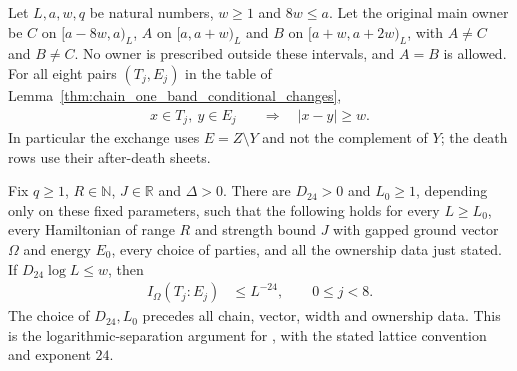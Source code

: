 \begin{lemma}
    \label{thm:chain_band_physical_information}
    \leanok
    Let $L,a,w,q$ be natural numbers, $w\ge1$ and $8w\le a$.
    Let the original main owner be $C$ on
    $\lbrack a-8w,a)_L$, $A$ on $\lbrack a,a+w)_L$ and $B$ on
    $[a+w,a+2w)_L$, with $A\ne C$ and $B\ne C$.
    No owner is prescribed outside these intervals, and $A=B$ is allowed.
    For all eight pairs $(T_j,E_j)$ in the table of
    Lemma~\ref{thm:chain_one_band_conditional_changes},
    \begin{align}
        x\in T_j,\ y\in E_j & \quad\Longrightarrow\quad |x-y|\ge w.
        \label{eq:chain_band_separation}
    \end{align}
    In particular the exchange uses $E=Z\setminus Y$ and not the
    complement of $Y$; the death rows use their after-death sheets.

    Fix $q\ge1$, $R\in\mathbb N$, $J\in\mathbb R$ and $\Delta>0$.
    There are $D_{24}>0$ and $L_0\ge1$, depending only on these fixed
    parameters, such that the following holds for every $L\ge L_0$,
    every Hamiltonian of range $R$ and strength bound $J$ with gapped
    ground vector $\Omega$ and energy $E_0$, every choice of parties,
    and all the ownership data just stated.
    If $D_{24}\log L\le w$, then
    \begin{align}
        I_\Omega(T_j:E_j) & \le L^{-24},\qquad 0\le j<8.
        \label{eq:chain_band_information}
    \end{align}
    The choice of $D_{24},L_0$ precedes all chain, vector, width and
    ownership data. This is the logarithmic-separation argument for
    \cite[Part~II, the band dissolution lemma]{TNLean2026OneDimensional},
    with the stated lattice convention and exponent $24$.
\end{lemma}
